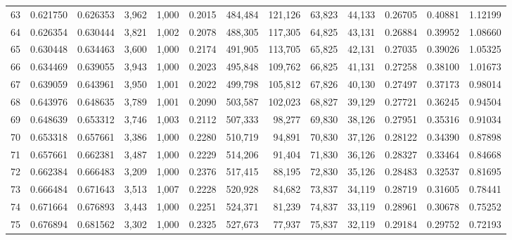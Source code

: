 \begin{tabular}{rrrrrrrrrrrrr}
63  &  0.621750 &  0.626353 &   3,962 &  1,000 &                                     0.2015 &  484,484 &  121,126 &   63,823 &   44,133 &  0.26705 &  0.40881 &  1.12199 \\
64  &  0.626354 &  0.630444 &   3,821 &  1,002 &                                     0.2078 &  488,305 &  117,305 &   64,825 &   43,131 &  0.26884 &  0.39952 &  1.08660 \\
65  &  0.630448 &  0.634463 &   3,600 &  1,000 &                                     0.2174 &  491,905 &  113,705 &   65,825 &   42,131 &  0.27035 &  0.39026 &  1.05325 \\
66  &  0.634469 &  0.639055 &   3,943 &  1,000 &                                     0.2023 &  495,848 &  109,762 &   66,825 &   41,131 &  0.27258 &  0.38100 &  1.01673 \\
67  &  0.639059 &  0.643961 &   3,950 &  1,001 &                                     0.2022 &  499,798 &  105,812 &   67,826 &   40,130 &  0.27497 &  0.37173 &  0.98014 \\
68  &  0.643976 &  0.648635 &   3,789 &  1,001 &                                     0.2090 &  503,587 &  102,023 &   68,827 &   39,129 &  0.27721 &  0.36245 &  0.94504 \\
69  &  0.648639 &  0.653312 &   3,746 &  1,003 &                                     0.2112 &  507,333 &   98,277 &   69,830 &   38,126 &  0.27951 &  0.35316 &  0.91034 \\
70  &  0.653318 &  0.657661 &   3,386 &  1,000 &                                     0.2280 &  510,719 &   94,891 &   70,830 &   37,126 &  0.28122 &  0.34390 &  0.87898 \\
71  &  0.657661 &  0.662381 &   3,487 &  1,000 &                                     0.2229 &  514,206 &   91,404 &   71,830 &   36,126 &  0.28327 &  0.33464 &  0.84668 \\
72  &  0.662384 &  0.666483 &   3,209 &  1,000 &                                     0.2376 &  517,415 &   88,195 &   72,830 &   35,126 &  0.28483 &  0.32537 &  0.81695 \\
73  &  0.666484 &  0.671643 &   3,513 &  1,007 &                                     0.2228 &  520,928 &   84,682 &   73,837 &   34,119 &  0.28719 &  0.31605 &  0.78441 \\
74  &  0.671664 &  0.676893 &   3,443 &  1,000 &                                     0.2251 &  524,371 &   81,239 &   74,837 &   33,119 &  0.28961 &  0.30678 &  0.75252 \\
75  &  0.676894 &  0.681562 &   3,302 &  1,000 &                                     0.2325 &  527,673 &   77,937 &   75,837 &   32,119 &  0.29184 &  0.29752 &  0.72193 \\

\end{tabular}
